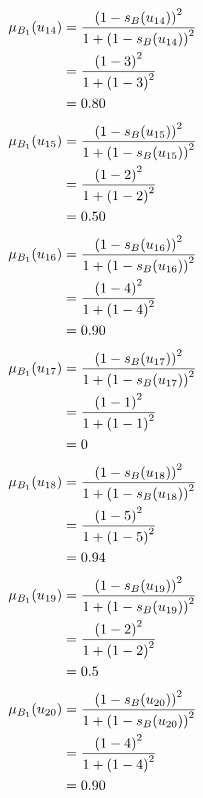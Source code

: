 \documentclass[a4paper,openany]{book}
\begin{document}
				\begin{align}
					\mu_{B_1}(u_{14}) &= \frac{\left(1-s_B(u_{14})\right)^2}{1 + \left(1-s_B(u_{14})\right)^2}\\
					&= \frac{\left(1-3\right)^2}{1 + \left(1-3\right)^2} \notag \\
					&= 0.80 \notag
				\end{align}
				\begin{align}
					\mu_{B_1}(u_{15}) &= \frac{\left(1-s_B(u_{15})\right)^2}{1 + \left(1-s_B(u_{15})\right)^2}\\
					&= \frac{\left(1-2\right)^2}{1 + \left(1-2\right)^2} \notag \\
					&= 0.50 \notag
				\end{align}
				\begin{align}
					\mu_{B_1}(u_{16}) &= \frac{\left(1-s_B(u_{16})\right)^2}{1 + \left(1-s_B(u_{16})\right)^2}\\
					&= \frac{\left(1-4\right)^2}{1 + \left(1-4\right)^2} \notag \\
					&= 0.90 \notag
				\end{align}
				\begin{align}
					\mu_{B_1}(u_{17}) &= \frac{\left(1-s_B(u_{17})\right)^2}{1 + \left(1-s_B(u_{17})\right)^2}\\
					&= \frac{\left(1-1\right)^2}{1 + \left(1-1\right)^2} \notag \\
					&= 0 \notag
				\end{align}
				\begin{align}
					\mu_{B_1}(u_{18}) &= \frac{\left(1-s_B(u_{18})\right)^2}{1 + \left(1-s_B(u_{18})\right)^2}\\
					&= \frac{\left(1-5\right)^2}{1 + \left(1-5\right)^2} \notag \\
					&= 0.94 \notag
				\end{align}
				\begin{align}
					\mu_{B_1}(u_{19}) &= \frac{\left(1-s_B(u_{19})\right)^2}{1 + \left(1-s_B(u_{19})\right)^2}\\
					&= \frac{\left(1-2\right)^2}{1 + \left(1-2\right)^2} \notag \\
					&= 0.5 \notag
				\end{align}
				\begin{align}
					\mu_{B_1}(u_{20}) &= \frac{\left(1-s_B(u_{20})\right)^2}{1 + \left(1-s_B(u_{20})\right)^2}\\
					&= \frac{\left(1-4\right)^2}{1 + \left(1-4\right)^2} \notag \\
					&= 0.90 \notag
				\end{align}
\end{document}
